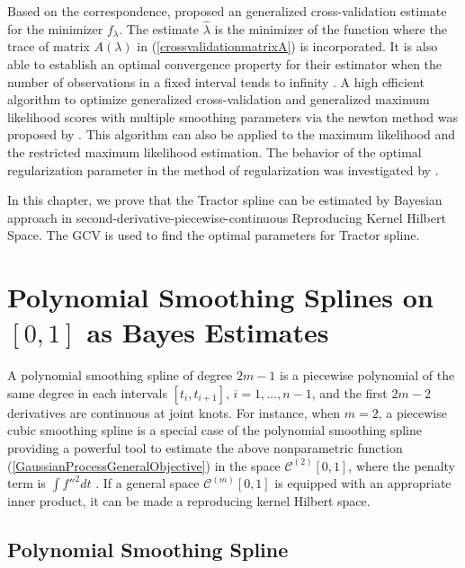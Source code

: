 Based on the correspondence, \cite{craven1978smoothing} proposed an generalized cross-validation estimate for the minimizer $f_\lambda$. The estimate $\hat{\lambda}$ is the minimizer of the function where the trace of matrix $A(\lambda)$ in (\ref{crossvalidationmatrixA}) is incorporated. It is also able to establish an optimal convergence property for their estimator when the number of observations in a fixed interval tends to infinity \cite{wecker1983signal}. A high efficient  algorithm to optimize generalized cross-validation and generalized maximum likelihood scores with multiple smoothing parameters via the newton method was proposed by \cite{gu1991minimizing}. This algorithm can also be applied to the maximum likelihood and the restricted maximum  likelihood estimation. The behavior of the optimal regularization parameter in the method of regularization was investigated by \cite{wahba1990optimal}. 



In this chapter, we prove that the Tractor spline can be estimated by Bayesian approach in second-derivative-piecewise-continuous Reproducing Kernel Hilbert Space. The GCV is used to find the optimal parameters for Tractor spline. 



\section{Polynomial Smoothing Splines on $[0, 1]$ as Bayes Estimates}

A polynomial smoothing spline of degree $2m-1$ is a piecewise polynomial of the same degree in each intervals $[t_i,t_{i+1}]$, $i=1, \ldots, n-1$, and the first $2m-2$ derivatives are continuous at joint knots. For instance, when $m=2$,  a piecewise cubic smoothing spline is a special case of the polynomial smoothing spline providing a powerful tool to estimate the above nonparametric function (\ref{GaussianProcessGeneralObjective}) in the space  $\mathcal{C}^{(2)}[0,1]$, where the penalty term is $\int f''^2dt$ \cite{hastie1990generalized}  \cite{wang1998smoothing}. If a general space $\mathcal{C}^{(m)}[0,1]$ is equipped with an appropriate inner product, it can be made a reproducing kernel Hilbert space. 

\subsection{Polynomial Smoothing Spline}

